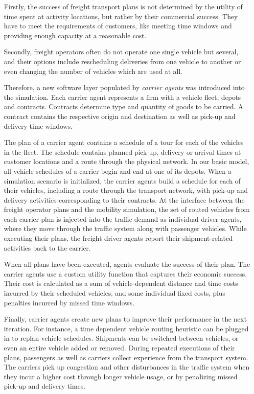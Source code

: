 Firstly, the success of freight transport plans is not determined by the utility of time
spent at activity locations, but rather by their commercial success. They have to meet the
requirements of customers, like meeting time windows and providing enough capacity at
a reasonable cost.

Secondly, freight operators often do not operate one single vehicle but several, and their
options include rescheduling deliveries from one vehicle to another or even changing the
number of vehicles which are used at all.

Therefore, a new software layer populated by \emph{carrier agents} was introduced into the
simulation. Each carrier agent represents a firm with a vehicle fleet, depots and contracts.
Contracts determine type and quantity of goods to be carried. A contract contains the respective 
origin and destination as well as pick-up and delivery time windows.

The plan of a carrier agent contains a schedule of a tour for each of the vehicles in the fleet. 
The schedule contains planned pick-up, delivery or arrival times at customer locations and a route through 
the physical network. In our basic model, all vehicle schedules of a carrier begin and end at one of its depots.
When a simulation scenario is initialized, the carrier agents build a schedule for each of their vehicles, 
including a route through the transport network, with pick-up and delivery activities corresponding to their contracts.
At the interface between the freight operator plans and the mobility simulation, the set of routed vehicles 
from each carrier plan is injected into the traffic demand as individual driver agents, where they move 
through the traffic system along with passenger vehicles. While executing their plans, the freight driver 
agents report their shipment-related activities back to the carrier.

When all plans have been executed, agents evaluate the success of their plan. The carrier agents use a custom 
utility function that captures their economic success. Their cost is calculated as a sum of vehicle-dependent 
distance and time costs incurred by their scheduled vehicles, and some individual fixed costs, plus penalties 
incurred by missed time windows.

Finally, carrier agents create new plans to improve their performance in the next iteration. For instance, a time dependent vehicle routing heuristic can be plugged in to replan vehicle schedules. Shipments can be switched between vehicles, or even an entire vehicle added or removed.
During repeated executions of their plans, passengers as well as carriers collect experience from the transport system. The carriers pick up congestion and other disturbances in the traffic system when they incur a higher cost through longer vehicle usage, or by penalizing missed pick-up and delivery times.

